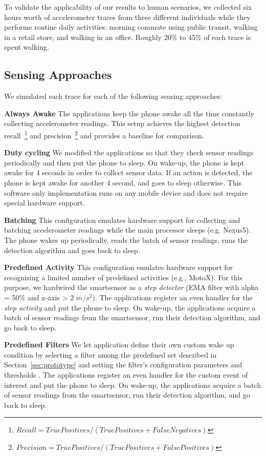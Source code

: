To validate the applicability of our results to human scenarios, we
collected six hours worth of accelerometer traces from three different
individuals while they performe routine daily activities: morning
commute using public transit, walking in a retail store, and walking
in an office.  Roughly 20\% to 45\% of each trace is spent
walking. 

\subsection{Sensing Approaches}

We simulated each trace for each of the following sensing approaches:

\textbf{Always Awake} The applications keep the phone awake all the
time constantly collecting accelerometer readings.  This setup
achieves the highest detection
recall~\footnote{$Recall=TruePositives/(TruePositives+FalseNegatives)$}
and
precision~\footnote{$Precision=TruePositives/(TruePositives+FalsePositives)$}
and provides a baseline for comparison.

\textbf{Duty cycling} We modified the applications so that they check
sensor readings periodically and then put the phone to sleep.  On
wake-up, the phone is kept awake for 4 seconds in order to collect
sensor data.  If an action is detected, the phone is kept awake for
another 4 second, and goes to sleep otherwise.  This software only
implementation runs on any mobile device and does not require special
hardware support.

\textbf{Batching} This configuration emulates hardware support for
collecting and batching accelerometer readings while the main
processor sleeps (e.g. Nexus5).  The phone wakes up periodically,
reads the batch of sensor readings, runs the detection algorithm and
goes back to sleep.

\textbf{Predefined Activity} This configuration emulates hardware
support for recognizing a limited number of predefined activities
(e.g., MotoX).  For this purpose, we hardwired the smartsensor as a
{\em step detector} (EMA filter with alpha = 50\% and x-axis > 2
$m/s^2$).  The applications register an even handler for the {\em step
  activity} and put the phone to sleep.  On wake-up, the applications
acquire a batch of sensor readings from the smartsensor, run their
detection algorithm, and go back to sleep.

\textbf{Predefined Filters} We let application define their own custom
wake up condition by selecting a filter among the predefined set described
in Section~\ref{sec:prototype} and setting the filter's configuration
parameters and thresholds .  The applications register an even handler
for the custom event of interest and put the phone to sleep.  On
wake-up, the applications acquire a batch of sensor readings from the
smartsensor, run their detection algorithm, and go back to sleep.


